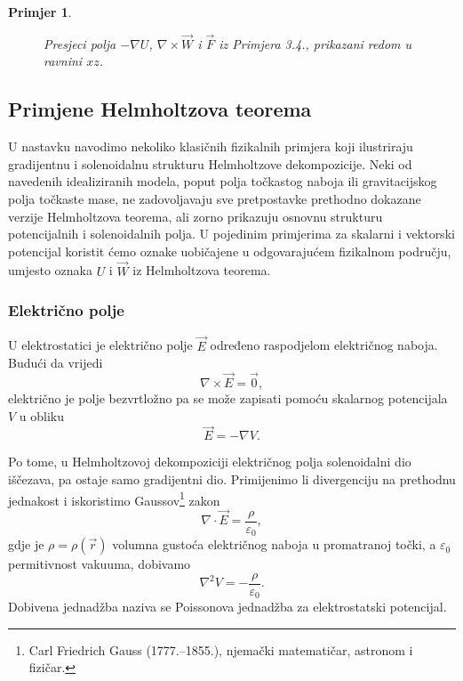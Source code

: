 \documentclass[12pt,a4paper]{article}
\newtheorem{pr}[tm]{Primjer}
\begin{document}
\begin{pr}
\begin{figure}[H]
{{%
}%
}
%
\hfill
{}%
\hfill
{}

\captionsetup{justification=centering}
\caption{Presjeci polja $-\nabla U$, $\nabla\times\overrightarrow{W}$ i
$\overrightarrow{F}$ iz Primjera 3.4., prikazani redom u ravnini $xz$.}
\end{figure}
\end{pr}

\subsection{Primjene Helmholtzova teorema}
U nastavku navodimo nekoliko klasičnih fizikalnih primjera koji ilustriraju
gradijentnu i solenoidalnu strukturu Helmholtzove dekompozicije. Neki od
navedenih idealiziranih modela, poput polja točkastog naboja ili gravitacijskog polja točkaste mase,
ne zadovoljavaju sve pretpostavke prethodno dokazane verzije Helmholtzova
teorema, ali zorno prikazuju osnovnu strukturu potencijalnih i solenoidalnih
polja. U pojedinim primjerima za skalarni i vektorski potencijal koristit ćemo
oznake uobičajene u odgovarajućem fizikalnom području, umjesto oznaka $U$ i
$\overrightarrow{W}$ iz Helmholtzova teorema.

\subsubsection{Električno polje}
U elektrostatici je električno polje $\overrightarrow{E}$ određeno raspodjelom
električnog naboja. Budući da vrijedi
$$
\nabla\times\overrightarrow{E}=\overrightarrow{0},
$$
električno je polje bezvrtložno pa se može zapisati pomoću skalarnog
potencijala $V$ u obliku
$$
\overrightarrow{E}=-\nabla V.
$$

Po tome, u Helmholtzovoj dekompoziciji električnog polja
solenoidalni dio iščezava, pa ostaje samo gradijentni dio. Primijenimo li divergenciju na prethodnu jednakost i iskoristimo Gaussov\footnote{Carl Friedrich Gauss (1777.--1855.), njemački matematičar, astronom i fizičar.}
zakon
$$
\nabla\cdot\overrightarrow{E}=\frac{\rho}{\varepsilon_0},
$$
gdje je $\rho=\rho(\overrightarrow{r})$ volumna gustoća električnog naboja u promatranoj točki, a $\varepsilon_0$ permitivnost vakuuma, dobivamo
$$
\nabla^2V=-\frac{\rho}{\varepsilon_0}.
$$
Dobivena jednadžba naziva se Poissonova jednadžba za elektrostatski
potencijal.
\end{document}
